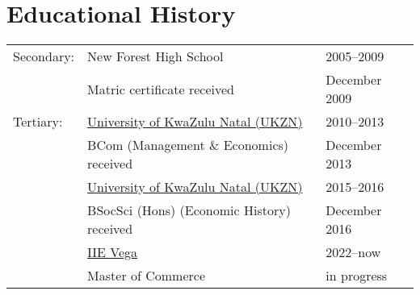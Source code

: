 \documentclass{article}
\begin{document}
\section*{Educational History}
\renewcommand{\t}{\hspace{0.4cm}}
\begin{center} \begin{tabular}{lp{}l}
\toprule

Secondary:
& New Forest High School                	                      & 2005--2009 \\
& \t Matric certificate received								 							  & \t December 2009 \\
\midrule

Tertiary:
& \href{http://ukzn.ac.za/}{University of KwaZulu Natal (UKZN)} & 2010--2013 \\
& \t BCom (Management \& Economics) received			              & \t December 2013 \\
\cmidrule{2-3}
& \href{http://ukzn.ac.za/}{University of KwaZulu Natal (UKZN)} & 2015--2016 \\
& \t BSocSci (Hons) (Economic History) received       						  & \t December 2016 \\
\cmidrule{2-3}
& \href{https://www.vegaschool.com/}{IIE Vega}	                & 2022--now \\
& \t Master of Commerce                 								 			  & \t in progress \\
\bottomrule
\end{tabular} \end{center}


\end{document}

